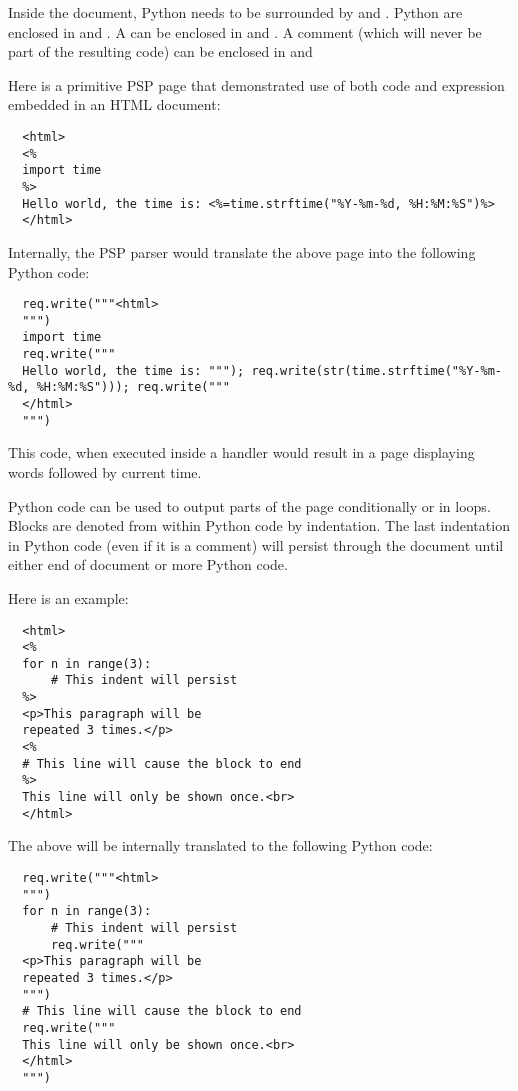 Inside the document, Python  needs to be surrounded by
\samp{<\%} and \samp{\%>}. Python  are enclosed in
\samp{<\%=} and \samp{\%>}. A  can be enclosed in
 and \samp{\%>}. A comment (which will never be part of
the resulting code) can be enclosed in \samp{<\%--} and \samp{--\%>}

Here is a primitive PSP page that demonstrated use of both code and
expression embedded in an HTML document:

\begin{verbatim}
  <html>
  <%
  import time
  %>
  Hello world, the time is: <%=time.strftime("%Y-%m-%d, %H:%M:%S")%>
  </html>
\end{verbatim}

Internally, the PSP parser would translate the above page into the
following Python code:

\begin{verbatim}
  req.write("""<html>
  """)
  import time
  req.write("""
  Hello world, the time is: """); req.write(str(time.strftime("%Y-%m-%d, %H:%M:%S"))); req.write("""
  </html>
  """)
\end{verbatim}

This code, when executed inside a handler would result in a page
displaying words  followed by current time.

Python code can be used to output parts of the page conditionally or
in loops. Blocks are denoted from within Python code by
indentation. The last indentation in Python code (even if it is a
comment) will persist through the document until either end of
document or more Python code.

Here is an example:
\begin{verbatim}
  <html>
  <%
  for n in range(3):
      # This indent will persist
  %>
  <p>This paragraph will be 
  repeated 3 times.</p>
  <%
  # This line will cause the block to end
  %>
  This line will only be shown once.<br>
  </html>
\end{verbatim}

The above will be internally translated to the following Python code:

\begin{verbatim}
  req.write("""<html>
  """)
  for n in range(3):
      # This indent will persist
      req.write("""
  <p>This paragraph will be
  repeated 3 times.</p>
  """)
  # This line will cause the block to end
  req.write("""
  This line will only be shown once.<br>
  </html>
  """)
\end{verbatim}

